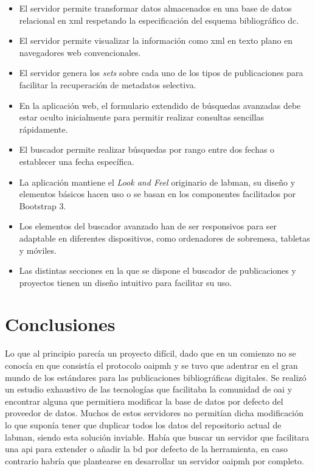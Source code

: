 \begin{itemize}
	\item El servidor permite transformar datos almacenados en una base de datos relacional en \acrshort{xml} respetando la especificación del esquema bibliográfico \acrshort{dc}.
	\item El servidor permite visualizar la información como \acrshort{xml} en texto plano en navegadores web convencionales.
	\item El servidor genera los \textit{sets} sobre cada uno de los tipos de publicaciones para facilitar la recuperación de metadatos selectiva.
	\item En la aplicación web, el formulario extendido de búsquedas avanzadas debe estar oculto inicialmente para permitir realizar consultas sencillas rápidamente.
	\item El buscador permite realizar búsquedas por rango entre dos fechas o establecer una fecha específica.
	\item La aplicación mantiene el \textit{Look and Feel} originario de \acrshort{labman}, su diseño y elementos básicos hacen uso o se basan en los componentes facilitados por Bootstrap 3.
	\item Los elementos del buscador avanzado han de ser responsivos para ser adaptable en diferentes dispositivos, como ordenadores de sobremesa, tabletas y móviles.
	\item Las distintas secciones en la que se dispone el buscador de publicaciones y proyectos tienen un diseño intuitivo para facilitar su uso. 
\end{itemize}

\section{Conclusiones}

Lo que al principio parecía un proyecto difícil, dado que en un comienzo no se conocía en que consistía el protocolo \acrshort{oaipmh} y se tuvo que adentrar en el gran mundo de los estándares para las publicaciones bibliográficas digitales. Se realizó un estudio exhaustivo de las tecnologías que facilitaba la comunidad de \acrshort{oai} y encontrar alguna que permitiera modificar la base de datos por defecto del proveedor de datos. Muchos de estos servidores no permitían dicha modificación lo que suponía tener que duplicar todos los datos del repositorio actual de \acrshort{labman}, siendo esta solución inviable. Había que buscar un servidor que facilitara una \acrshort{api} para extender o añadir la \acrshort{bd} por defecto de la herramienta, en caso contrario habría que plantearse en desarrollar un servidor \acrshort{oaipmh} por completo.

